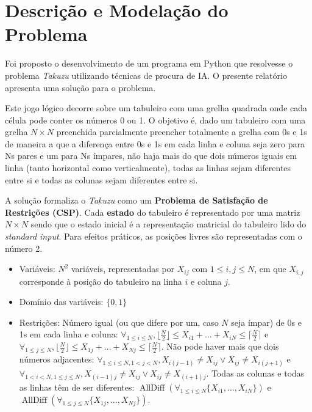 \documentclass[12pt,a4paper]{article}
\newcommand{\op}{\operatorname}
\begin{document}
\section{Descrição e Modelação do Problema}

Foi proposto o desenvolvimento de um programa em Python que resolvesse o
problema \textit{Takuzu} utilizando técnicas de procura de IA.
O presente relatório apresenta uma solução para o problema.

Este jogo lógico decorre sobre um tabuleiro com uma grelha quadrada onde cada célula
pode conter os números 0 ou 1.
O objetivo é, dado um tabuleiro com uma grelha \(N \times N\) preenchida parcialmente preencher totalmente a grelha com 0s e 1s de maneira
a que a diferença entre 0s e 1s em cada linha e coluna seja zero para Ns pares e um para Ns ímpares,
não haja mais do que dois números iguais em linha (tanto horizontal como verticalmente),
todas as linhas sejam diferentes entre si e todas as colunas sejam diferentes entre si.

A solução formaliza o \textit{Takuzu} como um \textbf{Problema de Satisfação de Restrições (CSP)}.
Cada \textbf{estado} do tabuleiro é representado por uma matriz \(N \times N\) sendo que o estado inicial
é a representação matricial do tabuleiro lido do \textit{standard input}.
Para efeitos práticos, as posições livres são representadas com o número 2.
\vspace{-0.2cm}
\begin{itemize}
  \setlength\itemsep{0em}
  \item Variáveis: \(N^2\) variáveis, representadas por \(X_{ij}\) com \(1 \leq i,j \leq N\), em que \(X_{i,j}\)
        corresponde à posição do tabuleiro na linha \(i\) e coluna \(j\).
  \item Domínio das variáveis: \(\{0, 1\}\)
  \item Restrições: Número igual (ou que difere por um, caso \(N\) seja ímpar) de 0s e 1s em cada linha e coluna:
        \(\forall_{1\leq i \leq N}, \lfloor \frac{N}{2} \rfloor \leq X_{i1} + \dots + X_{iN} \leq \lceil \frac{N}{2} \rceil\)
        e
        \(\forall_{1\leq j \leq N}, \lfloor \frac{N}{2} \rfloor \leq X_{1j} + \dots + X_{Nj} \leq \lceil \frac{N}{2} \rceil\).
        Não pode haver mais que dois números adjacentes:
        \(\forall_{1\leq i \leq N, 1 < j < N}, X_{i(j-1)} \ne X_{ij} \lor X_{ij} \ne X_{i(j+1)}\)
        e
        \(\forall_{1 < i < N, 1\leq j \leq N}, X_{(i-1)j} \ne X_{ij} \lor X_{ij} \ne X_{(i+1)j}\).
        Todas as colunas e todas as linhas têm de ser diferentes:
        \(\op{AllDiff}(\forall_{1\leq i \leq N} \{X_{i1}, \dots, X_{iN}\}) \)
        e
        \(\op{AllDiff}(\forall_{1\leq j \leq N} \{X_{1j}, \dots, X_{Nj}\}) \).
\end{itemize}
\end{document}
